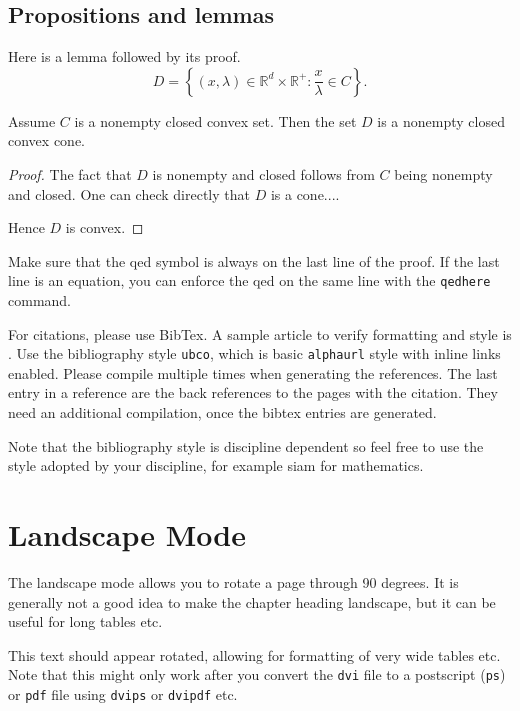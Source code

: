 \documentclass[msc,oneside]{ubcthesis}%
\newcommand{\R}{\mathbb{R}}   %
\begin{document}
\section{Propositions and lemmas}
Here is a lemma followed by its proof.
\[
D =\left\{ (x,\lambda)\in \R^d \times \R^+ : \frac{x}{\lambda} \in C\right\}.
\]

\begin{lemma}
Assume $C$ is a nonempty closed convex set. Then the set $D$ is a nonempty closed convex cone.
\end{lemma}

\begin{proof}
The fact that $D$ is nonempty and closed follows from $C$ being non\-empty and closed. One can check directly that $D$ is a cone....

Hence $D$ is convex.
\end{proof}
Make sure that the qed symbol is always on the last line of the proof. If the last line is an equation, you can enforce the qed on the same line with the \texttt{qedhere} command.

For citations, please use BibTex. A sample article to verify formatting and style is \cite{Bauschke:2007-PA02}. Use the bibliography style \texttt{ubco}, which is basic \texttt{alphaurl} style with inline links enabled. Please compile multiple times when generating the references. The last entry in a reference are the back references to the pages with the citation. They need an additional compilation, once the bibtex entries are generated.

Note that the bibliography style is discipline dependent so feel free to use the style adopted by your discipline, for example siam for mathematics.

\chapter{Landscape Mode}
The landscape mode allows you to rotate a page through 90 degrees.  It
is generally not a good idea to make the chapter heading landscape,
but it can be useful for long tables etc.

\begin{landscape}
  This text should appear rotated, allowing for formatting of very
  wide tables etc.  Note that this might only work after you convert
  the \texttt{dvi} file to a postscript (\texttt{ps}) or \texttt{pdf}
  file using \texttt{dvips} or \texttt{dvipdf} etc.
\end{landscape}
\end{document}

